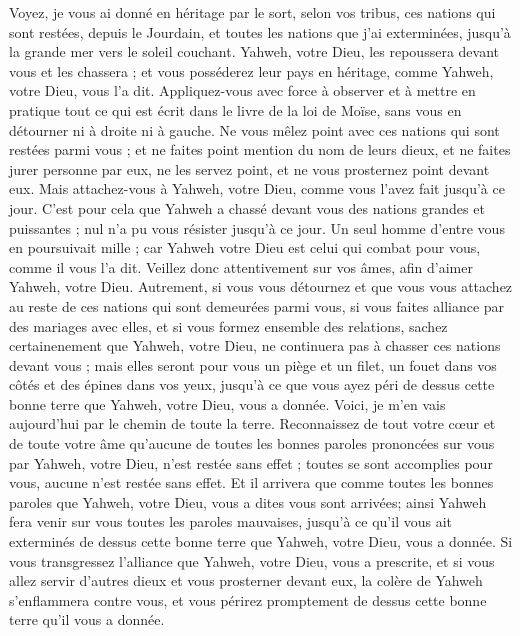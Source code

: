 \begin{multicols}{2}
Voyez, je vous ai donné en héritage par le sort, selon vos tribus, ces nations qui sont restées, depuis le Jourdain, et toutes les nations que j'ai exterminées, jusqu'à la grande mer vers le soleil couchant.
Yahweh, votre Dieu, les repoussera devant vous et les chassera ; et vous posséderez leur pays en héritage, comme Yahweh, votre Dieu, vous l'a dit.
Appliquez-vous avec force à observer et à mettre en pratique tout ce qui est écrit dans le livre de la loi de Moïse, sans vous en détourner ni à droite ni à gauche.
Ne vous mêlez point avec ces nations qui sont restées parmi vous ; et ne faites point mention du nom de leurs dieux, et ne faites jurer personne par eux, ne les servez point, et ne vous prosternez point devant eux.
Mais attachez-vous à Yahweh, votre Dieu, comme vous l'avez fait jusqu'à ce jour.
C'est pour cela que Yahweh a chassé devant vous des nations grandes et puissantes ; nul n'a pu vous résister jusqu'à ce jour.
Un seul homme d'entre vous en poursuivait mille ; car Yahweh votre Dieu est celui qui combat pour vous, comme il vous l'a dit.
Veillez donc attentivement sur vos âmes, afin d'aimer Yahweh, votre Dieu.
Autrement, si vous vous détournez et que vous vous attachez au reste de ces nations qui sont demeurées parmi vous, si vous faites alliance par des mariages avec elles, et si vous formez ensemble des relations,
sachez certainenement que Yahweh, votre Dieu, ne continuera pas à chasser ces nations devant vous ; mais elles seront pour vous un piège et un filet, un fouet dans vos côtés et des épines dans vos yeux, jusqu'à ce que vous ayez péri de dessus cette bonne terre que Yahweh, votre Dieu, vous a donnée.
Voici, je m'en vais aujourd'hui par le chemin de toute la terre. Reconnaissez de tout votre cœur et de toute votre âme qu'aucune de toutes les bonnes paroles prononcées sur vous par Yahweh, votre Dieu, n'est restée sans effet ; toutes se sont accomplies pour vous, aucune n'est restée sans effet.
Et il arrivera que comme toutes les bonnes paroles que Yahweh, votre Dieu, vous a dites vous sont arrivées; ainsi Yahweh fera venir sur vous toutes les paroles mauvaises, jusqu'à ce qu'il vous ait exterminés de dessus cette bonne terre que Yahweh, votre Dieu, vous a donnée.
Si vous transgressez l'alliance que Yahweh, votre Dieu, vous a prescrite, et si vous allez servir d'autres dieux et vous prosterner devant eux, la colère de Yahweh s'enflammera contre vous, et vous périrez promptement de dessus cette bonne terre qu'il vous a donnée.

\end{multicols}
